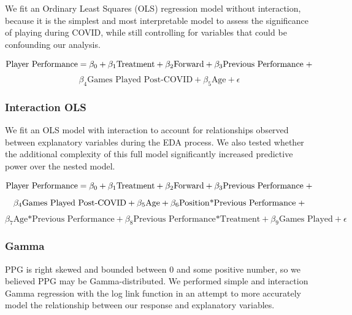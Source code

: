 \documentclass[12pt]{article}
\begin{document}
We fit an Ordinary Least Squares (OLS) regression model without
interaction, because it is the simplest and most interpretable model to
assess the significance of playing during COVID, while still controlling
for variables that could be confounding our analysis.

\vspace{-.5cm}

\[\text{Player Performance} = \beta_0 + \beta_1\text{Treatment} + \beta_2\text{Forward} +  \beta_3\text{Previous Performance} \hspace{.1cm} + \]
\[\beta_4\text{Games Played Post-COVID} + \beta_5\text{Age} + \epsilon\]

\hypertarget{interaction-ols}{%
\subsubsection{Interaction OLS}\label{interaction-ols}}

We fit an OLS model with interaction to account for relationships
observed between explanatory variables during the EDA process. We also
tested whether the additional complexity of this full model
significantly increased predictive power over the nested model.

\vspace{-.5cm}

\[\text{Player Performance} = \beta_{0} + \beta_{1}\text{Treatment} + \beta_{2}\text{Forward} +  \beta_{3}\text{Previous Performance} \hspace{.1cm} +\]
\[\beta_{4}\text{Games Played Post-COVID} + \beta_{5}\text{Age} + \beta_{6}\text{Position*Previous Performance} \hspace{.1cm} + \]
\[\beta_{7}\text{Age*Previous Performance} + \beta_{8}\text{Previous Performance*Treatment} + \beta_{9}\text{Games Played} + \epsilon\]

\hypertarget{gamma}{%
\subsubsection{Gamma}\label{gamma}}

PPG is right skewed and bounded between 0 and some positive number, so
we believed PPG may be Gamma-distributed. We performed simple and
interaction Gamma regression with the log link function in an attempt to
more accurately model the relationship between our response and
explanatory variables.

\vspace{-.5cm}
\end{document}

